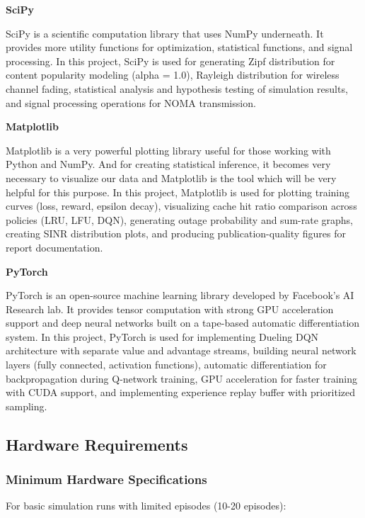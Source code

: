 \documentclass[12pt,a4paper]{article}
\begin{document}
\textbf{SciPy}

SciPy is a scientific computation library that uses NumPy underneath. It provides more utility functions for optimization, statistical functions, and signal processing. In this project, SciPy is used for generating Zipf distribution for content popularity modeling (alpha = 1.0), Rayleigh distribution for wireless channel fading, statistical analysis and hypothesis testing of simulation results, and signal processing operations for NOMA transmission.

\textbf{Matplotlib}

Matplotlib is a very powerful plotting library useful for those working with Python and NumPy. And for creating statistical inference, it becomes very necessary to visualize our data and Matplotlib is the tool which will be very helpful for this purpose. In this project, Matplotlib is used for plotting training curves (loss, reward, epsilon decay), visualizing cache hit ratio comparison across policies (LRU, LFU, DQN), generating outage probability and sum-rate graphs, creating SINR distribution plots, and producing publication-quality figures for report documentation.

\textbf{PyTorch}

PyTorch is an open-source machine learning library developed by Facebook's AI Research lab. It provides tensor computation with strong GPU acceleration support and deep neural networks built on a tape-based automatic differentiation system. In this project, PyTorch is used for implementing Dueling DQN architecture with separate value and advantage streams, building neural network layers (fully connected, activation functions), automatic differentiation for backpropagation during Q-network training, GPU acceleration for faster training with CUDA support, and implementing experience replay buffer with prioritized sampling.


\subsection{Hardware Requirements}

\subsubsection{Minimum Hardware Specifications}

For basic simulation runs with limited episodes (10-20 episodes):
\end{document}
